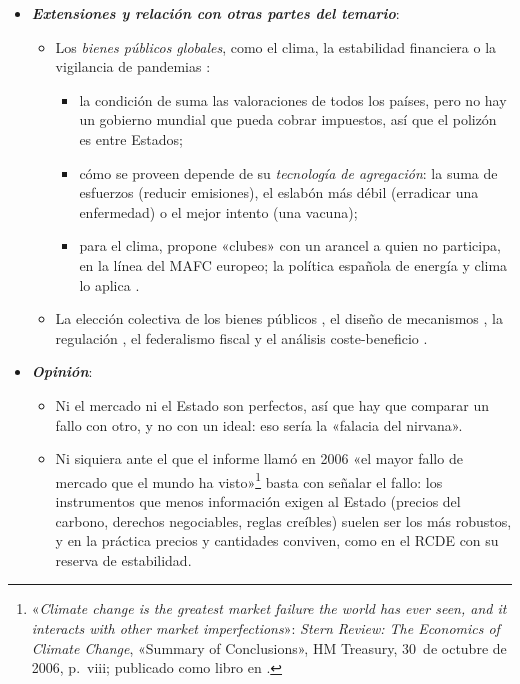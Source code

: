 \documentclass[11pt]{article}
\begin{document}
\begin{itemize}
\item \textbf{\emph{Extensiones y relación con otras partes del temario}}:
  \begin{itemize}
  \item Los \emph{bienes públicos globales}, como el clima, la estabilidad financiera o la vigilancia de pandemias :
    \begin{itemize}
    \item la condición de  suma las valoraciones de todos los países, pero no hay un gobierno mundial que pueda cobrar impuestos, así que el polizón es entre Estados\nocite{Kindleberger1986International};
    \item cómo se proveen depende de su \emph{tecnología de agregación}: la suma de esfuerzos (reducir emisiones), el eslabón más débil (erradicar una enfermedad) o el mejor intento (una vacuna)\nocite{Hirshleifer1983Weakest};
    \item para el clima, \textcite{Nordhaus2015Climate} propone «clubes» con un arancel a quien no participa, en la línea del MAFC europeo; la política española de energía y clima lo aplica .
    \end{itemize}
  \item La elección colectiva de los bienes públicos , el diseño de mecanismos , la regulación , el federalismo fiscal  y el análisis coste-beneficio .
  \end{itemize}

\item \textbf{\emph{Opinión}}:
  \begin{itemize}
  \item Ni el mercado ni el Estado son perfectos, así que hay que comparar un fallo con otro, y no con un ideal: eso sería la «falacia del nirvana»\nocite{Demsetz1969Information}.

  \item Ni siquiera ante el que el informe  llamó en 2006 «el mayor fallo de mercado que el mundo ha visto»\footnote{«\emph{Climate change is the greatest market failure the world has ever seen, and it interacts with other market imperfections}»: \emph{Stern Review: The Economics of Climate Change}, «Summary of Conclusions», HM Treasury, 30~de octubre de 2006, p.~viii; publicado como libro en \textcite{Stern2007Economics}.} basta con señalar el fallo: los instrumentos que menos información exigen al Estado (precios del carbono, derechos negociables, reglas creíbles) suelen ser los más robustos, y en la práctica precios y cantidades conviven, como en el RCDE con su reserva de estabilidad.
  \end{itemize}


\end{itemize}
\end{document}

